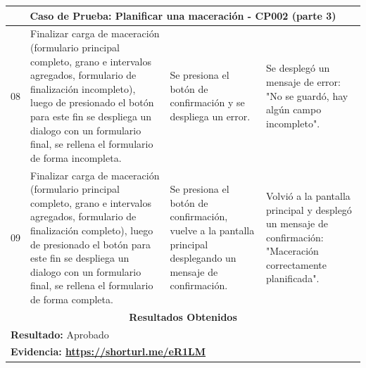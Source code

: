         \begin{minipage}{0.95\textwidth}
        \begin{center}
        \begin{tabularx}{\textwidth}{ | p{2cm} | X | X | X |}
        \hline
        \multicolumn{4}{|c|}{\textbf{Caso de Prueba: Planificar una maceración - CP002 (parte 3)}} \\
        \hline
        08 & Finalizar carga de maceración (formulario principal completo, grano e intervalos agregados, formulario de finalización incompleto), luego de presionado el botón para este fin se despliega un dialogo con un formulario final, se rellena el formulario de forma incompleta. & Se presiona el botón de confirmación y se despliega un error. & Se desplegó un mensaje de error: "No se guardó, hay algún campo incompleto".\\
        \hline
        09 & Finalizar carga de maceración (formulario principal completo, grano e intervalos agregados, formulario de finalización completo), luego de presionado el botón para este fin se despliega un dialogo con un formulario final, se rellena el formulario de forma completa. & Se presiona el botón de confirmación, vuelve a la pantalla principal desplegando un mensaje de confirmación. & Volvió a la pantalla principal y desplegó un mensaje de confirmación: "Maceración correctamente planificada".\\
        \hline
        \multicolumn{4}{|c|}{\textbf{Resultados Obtenidos}} \\
        \hline
        \multicolumn{4}{|l|}{\textbf{Resultado:} Aprobado} \\
        \hline
        \multicolumn{4}{|l|}{\textbf{Evidencia: \url{https://shorturl.me/eR1LM} }} \\
        \hline
     \end{tabularx}
    \label{CP002-p3}
    \end{center}
    \end{minipage}
    
